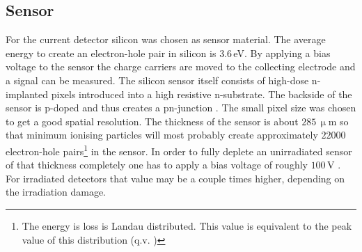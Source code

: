 \documentclass[british,11pt,a4paper]{memoir}
\begin{document}
\subsection{Sensor}\label{s220}
For the current detector silicon was chosen as sensor material. The average energy to create an electron-hole pair in silicon is $3.6\,$eV. By applying a bias voltage to the sensor the charge carriers are moved to the collecting electrode and a signal can be measured. The silicon sensor itself consists of high-dose n-implanted pixels introduced into a high resistive n-substrate. The backside of the sensor is p-doped and thus creates a pn-junction \cite{allkofer}. The small pixel size was chosen to get a good spatial resolution. The thickness of the sensor is about $285\,\upmu$m so that minimum ionising particles will most probably create approximately $22000$ electron-hole pairs\footnote{The energy is loss is Landau distributed. This value is equivalent to the peak value of this distribution (q.v. )} in the sensor. In order to fully deplete an unirradiated sensor of that thickness completely one has to apply a bias voltage of roughly $100\,$V \cite{pixadd}. For irradiated detectors that value may be a couple times higher, depending on the irradiation damage. 
\end{document}
